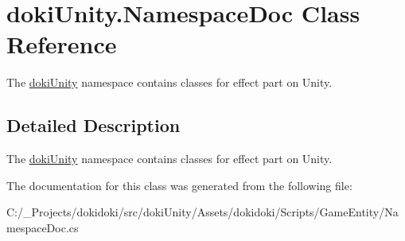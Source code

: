 \hypertarget{classdoki_unity_1_1_namespace_doc}{}\section{doki\+Unity.\+Namespace\+Doc Class Reference}
\label{classdoki_unity_1_1_namespace_doc}


The \hyperlink{namespacedoki_unity}{doki\+Unity} namespace contains classes for effect part on Unity.  




\subsection{Detailed Description}
The \hyperlink{namespacedoki_unity}{doki\+Unity} namespace contains classes for effect part on Unity. 



The documentation for this class was generated from the following file\+:\begin{DoxyCompactItemize}
\item 
C\+:/\+\_\+\+Projects/dokidoki/src/doki\+Unity/\+Assets/dokidoki/\+Scripts/\+Game\+Entity/Namespace\+Doc.\+cs\end{DoxyCompactItemize}
